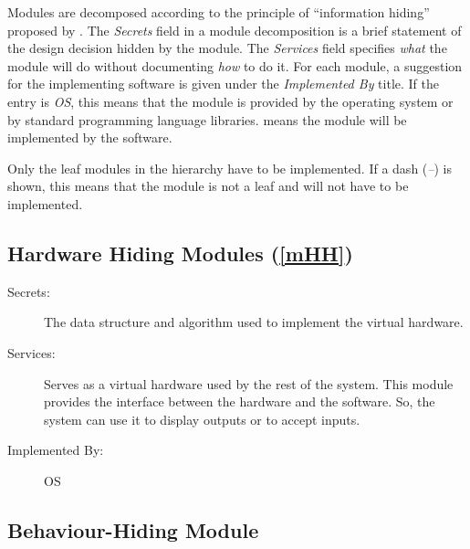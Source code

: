 \documentclass[12pt, titlepage]{article}
\begin{document}
Modules are decomposed according to the principle of ``information hiding'' proposed by
\citet{ParnasEtAl1984}. The \emph{Secrets} field in a module decomposition is a brief statement of
the design decision hidden by the module. The \emph{Services} field specifies \emph{what} the
module will do without documenting \emph{how} to do it. For each module, a suggestion for the
implementing software is given under the \emph{Implemented By} title. If the entry is \emph{OS},
this means that the module is provided by the operating system or by standard programming language
libraries. \emph{\progname{}} means the module will be implemented by the \progname{} software.

Only the leaf modules in the hierarchy have to be implemented. If a dash (\emph{--}) is shown, this
means that the module is not a leaf and will not have to be implemented.

\subsection{Hardware Hiding Modules (\ref{mHH})}

\begin{description}
	\item[Secrets:]The data structure and algorithm used to implement the virtual hardware.
	\item[Services:]Serves as a virtual hardware used by the rest of the system. This module provides the
	interface between the hardware and the software. So, the system can use it to display outputs or to
	accept inputs.
	\item[Implemented By:] OS
\end{description}

\subsection{Behaviour-Hiding Module}

\end{document}
